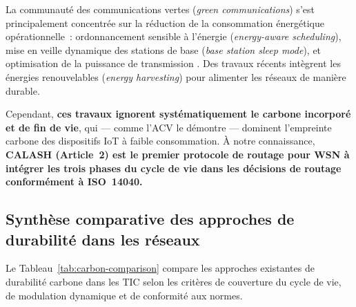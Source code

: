 La communauté des communications vertes (\emph{green communications}) s'est principalement concentrée sur la réduction de la consommation énergétique opérationnelle~: ordonnancement sensible à l'énergie (\emph{energy-aware scheduling}), mise en veille dynamique des stations de base (\emph{base station sleep mode}), et optimisation de la puissance de transmission \cite{freitag2021ict}. Des travaux récents intègrent les énergies renouvelables (\emph{energy harvesting}) pour alimenter les réseaux de manière durable.

Cependant, \textbf{ces travaux ignorent systématiquement le carbone incorporé et de fin de vie}, qui --- comme l'ACV le démontre --- dominent l'empreinte carbone des dispositifs IoT à faible consommation. À notre connaissance, \textbf{CALASH (Article~2) est le premier protocole de routage pour WSN à intégrer les trois phases du cycle de vie dans les décisions de routage conformément à ISO~14040.}

\subsection{Synthèse comparative des approches de durabilité dans les réseaux}

Le Tableau~\ref{tab:carbon-comparison} compare les approches existantes de durabilité carbone dans les TIC selon les critères de couverture du cycle de vie, de modulation dynamique et de conformité aux normes.

